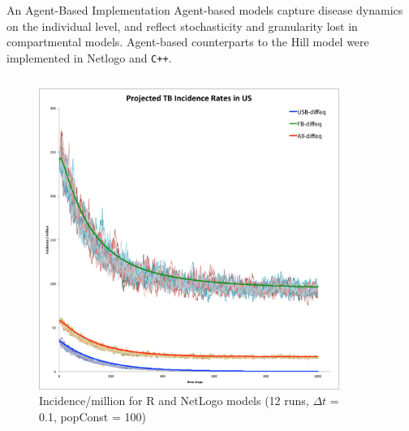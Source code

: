 \documentclass[final]{beamer}
\begin{document}
\begin{frame}
\begin{columns}[T]
    \begin{column}{.3\textwidth}
      \begin{block}{An Agent-Based Implementation}
        Agent-based models capture disease dynamics on the individual level, and
        reflect stochasticity and granularity lost in compartmental models.
        Agent-based counterparts to the Hill model were implemented in Netlogo
        and \texttt{C++}.
        \begin{columns}
          \begin{column}{.45\textwidth}
            \begin{figure}[h]
              \begin{center}
                \includegraphics[width=\textwidth]{NLHMinc}
              \end{center}
              \caption{Incidence/million for R and NetLogo models (12 runs, $\Delta t$ = 0.1, popConst = 100)}
              \label{fig:NLHMinc}
            \end{figure}
          \end{column}
          \begin{column}{.45\textwidth}
            \begin{figure}[h]

\end{figure}
\end{column}
\end{columns}
\end{block}
\end{column}
\end{columns}
\end{frame}
\end{document}
